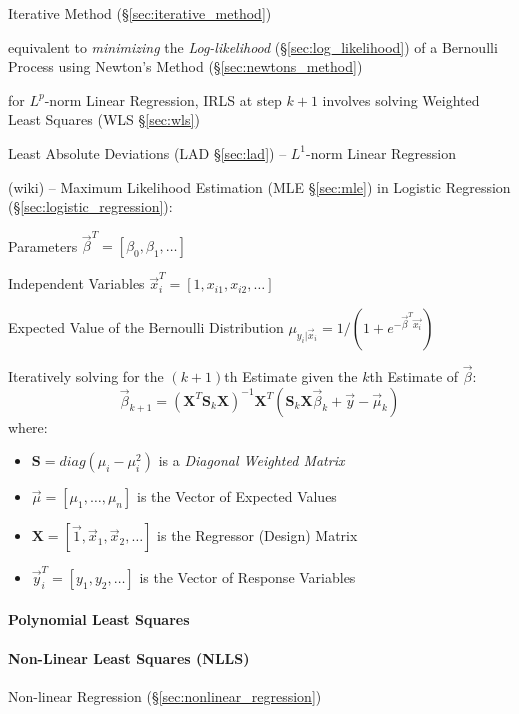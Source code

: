 Iterative Method (\S\ref{sec:iterative_method})

equivalent to \emph{minimizing} the \emph{Log-likelihood}
(\S\ref{sec:log_likelihood}) of a Bernoulli Process using Newton's Method
(\S\ref{sec:newtons_method})

for $L^p$-norm Linear Regression, IRLS at step $k+1$ involves solving Weighted
Least Squares (WLS \S\ref{sec:wls})

Least Absolute Deviations (LAD \S\ref{sec:lad}) -- $L^1$-norm Linear Regression

(wiki) --
Maximum Likelihood Estimation (MLE \S\ref{sec:mle}) in Logistic Regression
(\S\ref{sec:logistic_regression}):

Parameters $\vec{\beta}^T = [\beta_0, \beta_1, \ldots]$

Independent Variables $\vec{x}_i^T = [1, x_{i1}, x_{i2}, \ldots]$

Expected Value of the Bernoulli Distribution
$\mu_{y_i | \vec{x}_i} = 1 / (1 + e^{-\vec{\beta}^T \vec{x_i}})$

Iteratively solving for the $(k+1)$th Estimate given the $k$th Estimate of
$\vec{\beta}$:
\[
  \vec{\beta}_{k+1} = (\mathbf{X}^T \mathbf{S}_k \mathbf{X})^{-1} \mathbf{X}^T
    (\mathbf{S}_k \mathbf{X} \vec{\beta}_k + \vec{y} - \vec{\mu}_k)
\]
where:
\begin{itemize}
  \item $\mathbf{S} = diag(\mu_i - \mu_i^2)$ is a
    \emph{Diagonal Weighted Matrix}
  \item $\vec{\mu} = [\mu_1, \ldots, \mu_n]$ is the Vector of Expected Values
  \item $\mathbf{X} = [\vec{1}, \vec{x}_1, \vec{x}_2, \ldots]$ is the Regressor
    (Design) Matrix
  \item $\vec{y}_i^T = [y_1, y_2, \ldots]$ is the Vector of Response Variables
\end{itemize}



\paragraph{Polynomial Least Squares}\label{sec:polynomial_least_squares}\hfill

\paragraph{Non-Linear Least Squares (NLLS)}\label{sec:nlls}\hfill

Non-linear Regression (\S\ref{sec:nonlinear_regression})

